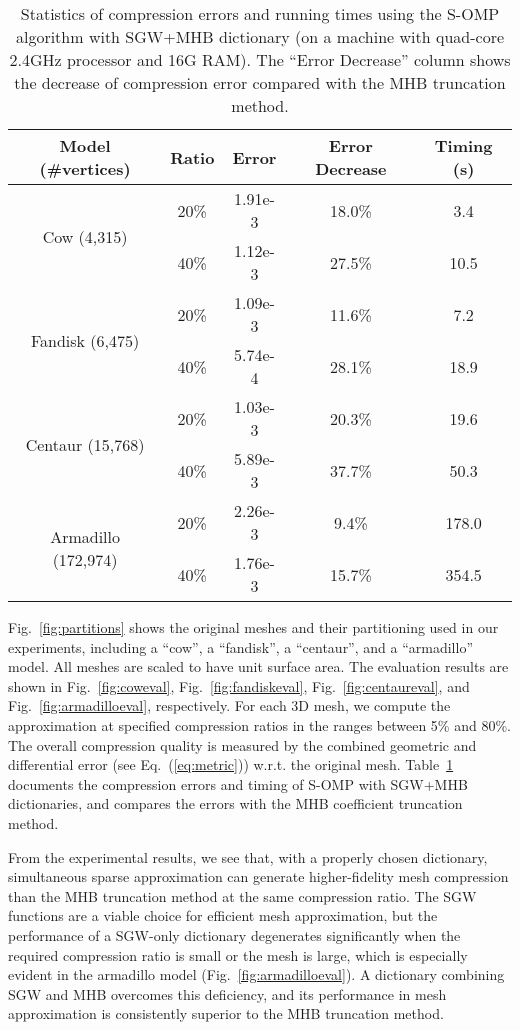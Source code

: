 \begin{table}[th]
\centering
\begin{tabular}{ |c|c|c|c|c| }
\hline
Model (\#vertices) & Ratio & Error & Error Decrease & Timing (s) \\
\hline
\multirow{2}{*}{Cow (4,315)} & 20\% & 1.91e-3 & 18.0\% & 3.4 \\
                             & 40\% & 1.12e-3 & 27.5\% & 10.5 \\
\hline
\multirow{2}{*}{Fandisk (6,475)} & 20\% & 1.09e-3 & 11.6\% & 7.2 \\
                                 & 40\% & 5.74e-4 & 28.1\% & 18.9 \\
\hline
\multirow{2}{*}{Centaur (15,768)} & 20\% & 1.03e-3 & 20.3\% & 19.6 \\
                                  & 40\% & 5.89e-3 & 37.7\% & 50.3 \\
\hline
\multirow{2}{*}{Armadillo (172,974)} & 20\% & 2.26e-3 & 9.4\% & 178.0 \\
                                     & 40\% & 1.76e-3 & 15.7\% & 354.5 \\
\hline
\end{tabular}
\caption[Statistics of compression errors and running times using different dictionary.]
{Statistics of compression errors and
    running times using the S-OMP algorithm with SGW+MHB dictionary
    (on a machine with quad-core 2.4GHz processor and 16G RAM).
    The ``Error Decrease'' column shows the decrease of compression
    error compared with the MHB truncation method.}
\label{tab:stat}
\end{table}

Fig.~\ref{fig:partitions} shows the original meshes and their
partitioning used in our experiments, including a ``cow'', a
``fandisk'', a ``centaur'', and a ``armadillo'' model. All meshes are
scaled to have unit surface area. The evaluation results are shown in
Fig.~\ref{fig:coweval}, Fig.~\ref{fig:fandiskeval},
Fig.~\ref{fig:centaureval}, and Fig.~\ref{fig:armadilloeval},
respectively. For each 3D mesh, we compute the approximation at
specified compression ratios in the ranges between 5\% and 80\%. The
overall compression quality is measured by the combined geometric and
differential error (see Eq.~(\ref{eq:metric})) w.r.t. the original
mesh. Table~\ref{tab:stat} documents the compression errors and timing
of S-OMP with SGW+MHB dictionaries, and compares the errors with the
MHB coefficient truncation method.

From the experimental results, we see that, with a properly chosen
dictionary, simultaneous sparse approximation can generate
higher-fidelity mesh compression than the MHB truncation method at the
same compression ratio. The SGW functions are a viable choice for
efficient mesh approximation, but the performance of a SGW-only
dictionary degenerates significantly when the required compression
ratio is small or the mesh is large, which is especially evident in the armadillo
model (Fig.~\ref{fig:armadilloeval}). A dictionary combining SGW and MHB
overcomes this deficiency, and its performance in mesh approximation
is consistently superior to the MHB truncation method.

